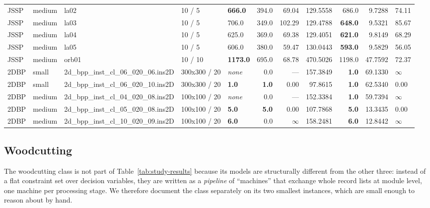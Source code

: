 \documentclass[11pt,a4paper]{article}
\begin{document}
\begin{table}
\begin{tabular}{@{}lllllrrrrrl@{}}
JSSP & medium & la02 & 10 / 5 & \textbf{666.0} & 394.0 & 69.04 & 129.5558 & 686.0 & 9.7288 & 74.11 \\
JSSP & medium & la03 & 10 / 5 & 706.0 & 349.0 & 102.29 & 129.4788 & \textbf{648.0} & 9.5321 & 85.67 \\
JSSP & medium & la04 & 10 / 5 & 625.0 & 369.0 & 69.38 & 129.4051 & \textbf{621.0} & 9.8149 & 68.29 \\
JSSP & medium & la05 & 10 / 5 & 606.0 & 380.0 & 59.47 & 130.0443 & \textbf{593.0} & 9.5829 & 56.05 \\
JSSP & medium & orb01 & 10 / 10 & \textbf{1173.0} & 695.0 & 68.78 & 470.5026 & 1198.0 & 47.7592 & 72.37 \\
\addlinespace
2DBP & small & 2d\_bpp\_inst\_cl\_06\_020\_06.ins2D & 300x300 / 20 & \textit{none} & 0.0 & --- & 157.3849 & \textbf{1.0} & 69.1330 & $\infty$ \\
2DBP & small & 2d\_bpp\_inst\_cl\_06\_020\_10.ins2D & 300x300 / 20 & \textbf{1.0} & \textbf{1.0} & 0.00 & 97.8615 & \textbf{1.0} & 62.5340 & 0.00 \\
2DBP & medium & 2d\_bpp\_inst\_cl\_04\_020\_08.ins2D & 100x100 / 20 & \textit{none} & 0.0 & --- & 152.3384 & \textbf{1.0} & 59.7394 & $\infty$ \\
2DBP & medium & 2d\_bpp\_inst\_cl\_05\_020\_08.ins2D & 100x100 / 20 & \textbf{5.0} & \textbf{5.0} & 0.00 & 107.7868 & \textbf{5.0} & 13.3435 & 0.00 \\
2DBP & medium & 2d\_bpp\_inst\_cl\_10\_020\_09.ins2D & 100x100 / 20 & \textbf{6.0} & 0.0 & $\infty$ & 158.2481 & \textbf{6.0} & 12.8442 & $\infty$ \\
\bottomrule
\end{tabular}
\end{table}

\subsection{Woodcutting}
\label{sec:woodcutting}
The woodcutting class is not part of Table~\ref{tab:study-results} because its
models are structurally different from the other three: instead of a flat
constraint set over decision variables, they are written as a \emph{pipeline}
of ``machines'' that exchange whole record lists at module level, one machine
per processing stage.
We therefore document the class separately on its two smallest instances,
which are small enough to reason about by hand.
\end{document}

